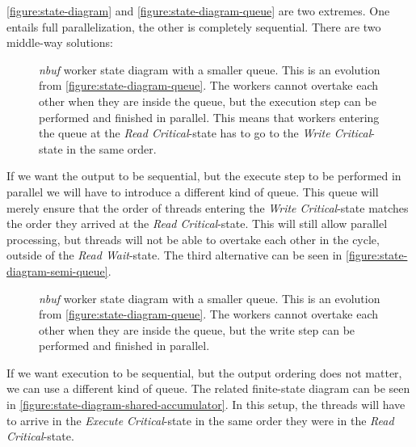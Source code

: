 \documentclass[a4paper]{article}
\newcommand{\nbuf}{\textit{nbuf} }
\begin{document}
\autoref{figure:state-diagram} and \autoref{figure:state-diagram-queue} are two extremes. One entails full parallelization, the other is completely sequential. There are two middle-way solutions:\\


\begin{figure}
	\begin{adjustwidth}{-0.5in}{-0.5in}
    \centering
    \def\svgwidth{\columnwidth}
    
  	\caption{\nbuf worker state diagram with a smaller queue. This is an evolution from \autoref{figure:state-diagram-queue}. The workers cannot overtake each other when they are inside the queue, but the execution step can be performed and finished in parallel. This means that workers entering the queue at the \textit{Read Critical}-state has to go to the \textit{Write Critical}-state in the same order.}
	\label{figure:state-diagram-semi-queue}
	\end{adjustwidth}
\end{figure}

If we want the output to be sequential, but the execute step to be performed in parallel we will have to introduce a different kind of queue. This queue will merely ensure that the order of threads entering the \textit{Write Critical}-state matches the order they arrived at the \textit{Read Critical}-state. This will still allow parallel processing, but threads will not be able to overtake each other in the cycle, outside of the \textit{Read Wait}-state. The third alternative can be seen in \autoref{figure:state-diagram-semi-queue}.

\begin{figure}
	\begin{adjustwidth}{-0.5in}{-0.5in}
    \centering
    \def\svgwidth{\columnwidth}
    
  	\caption{\nbuf worker state diagram with a smaller queue. This is an evolution from \autoref{figure:state-diagram-queue}. The workers cannot overtake each other when they are inside the queue, but the write step can be performed and finished in parallel.}
	\label{figure:state-diagram-shared-accumulator}
	\end{adjustwidth}
\end{figure}

If we want execution to be sequential, but the output ordering does not matter, we can use a different kind of queue. The related finite-state diagram can be seen in \autoref{figure:state-diagram-shared-accumulator}. In this setup, the threads will have to arrive in the \textit{Execute Critical}-state in the same order they were in the \textit{Read Critical}-state.\\
\end{document}

